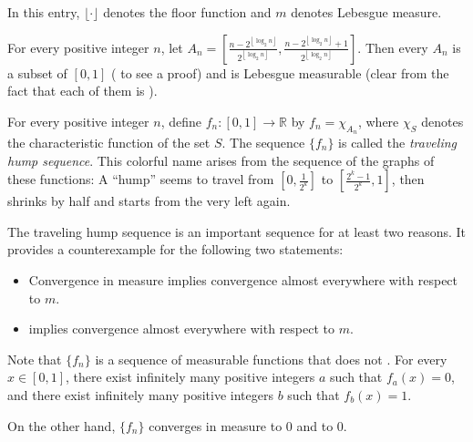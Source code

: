 \documentclass[12pt]{article}
\begin{document}
In this entry, $\lfloor \cdot \rfloor$ denotes the floor function and $m$ denotes Lebesgue measure.

For every positive integer $n$, let $\displaystyle A_n=\left[ \frac{n-2^{\left\lfloor \log_2 n \right\rfloor}}{2^{\left\lfloor \log_2 n \right\rfloor}} , \frac{n-2^{\left\lfloor \log_2 n \right\rfloor}+1}{2^{\left\lfloor \log_2 n \right\rfloor}} \right]$.  Then every $A_n$ is a subset of $[0,1]$ ( to see a proof) and is Lebesgue measurable (clear from the fact that each of them is ).

For every positive integer $n$, define $f_n \colon [0,1] \to \mathbb{R}$ by $f_n=\chi_{A_n}$, where $\chi_S$ denotes the characteristic function of the set $S$.  The sequence $\{f_n\}$ is called the \emph{traveling hump sequence}.  This colorful name arises from the sequence of the graphs of these functions: A ``hump'' seems to travel from $\displaystyle \left[ 0, \frac{1}{2^k} \right]$ to $\displaystyle \left[ \frac{2^k-1}{2^k}, 1 \right]$, then shrinks by half and starts from the very left again.

The traveling hump sequence is an important sequence for at least two reasons.  It provides a counterexample for the following two statements:

\begin{itemize}

\item Convergence in measure implies convergence almost everywhere with respect to $m$.

\item {} implies convergence almost everywhere with respect to $m$.

\end{itemize}

Note that $\{f_n\}$ is a sequence of measurable functions that does not .  For every $x \in [0,1]$, there exist infinitely many positive integers $a$ such that $f_a(x)=0$, and there exist infinitely many positive integers $b$ such that $f_b(x)=1$.

On the other hand, $\{f_n\}$ converges in measure to $0$ and  to $0$.
\end{document}
